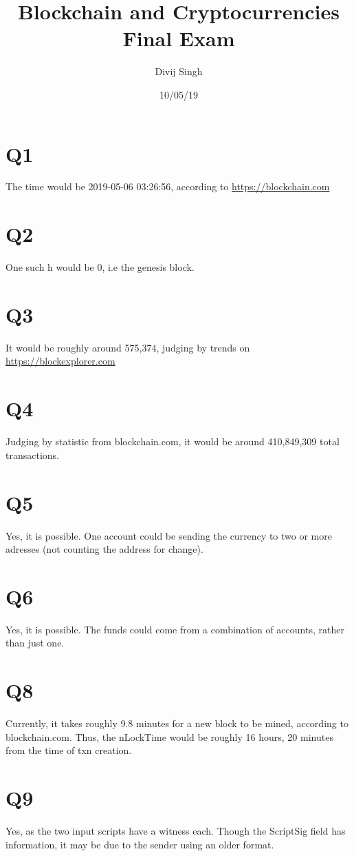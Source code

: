 \documentclass{article}
\title{Blockchain and Cryptocurrencies Final Exam}
\author{Divij Singh}
\date{10/05/19}
\begin{document}
	\maketitle
	
	\section{Q1}

The time would be 2019-05-06 03:26:56, according to \url{https://blockchain.com}

\section{Q2}
One such h would be 0, i.e the genesis block.

\section{Q3}
It would be roughly around 575,374, judging by trends on \url{https://blockexplorer.com}

\section{Q4}
Judging by statistic from blockchain.com, it would be around 410,849,309 total transactions.

\section{Q5}
Yes, it is possible. One account could be sending the currency to two or more adresses (not counting the address for change).

\section{Q6}
Yes, it is possible. The funds could come from a combination of accounts, rather than just one.

\section{Q8}
Currently, it takes roughly 9.8 minutes for a new block to be mined, according to blockchain.com. Thus, the nLockTime would be roughly 16 hours, 20 minutes from the time of txn creation.

\section{Q9}
Yes, as the two input scripts have a witness each. Though the ScriptSig field has information, it may be due to the sender using an older format.
\end{document}
